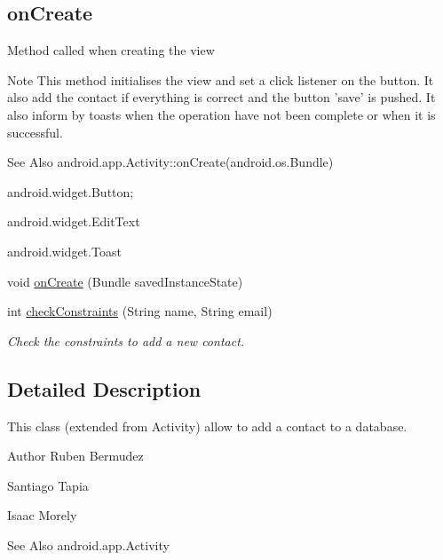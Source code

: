 \subsection*{on\-Create}
\label{_amgrp482302d6ece95c8faf5dae4403ae20ba}%
Method called when creating the view

\begin{DoxyNote}{Note}
This method initialises the view and set a click listener on the button. It also add the contact if everything is correct and the button 'save' is pushed. It also inform by toasts when the operation have not been complete or when it is successful. 
\end{DoxyNote}
\begin{DoxySeeAlso}{See Also}
android.\-app.\-Activity\-::on\-Create(android.\-os.\-Bundle) 

android.\-widget.\-Button; 

android.\-widget.\-Edit\-Text 

android.\-widget.\-Toast 
\end{DoxySeeAlso}
\begin{DoxyCompactItemize}
\item 
void \hyperlink{classnpi_1_1practicaandroid_1_1tutorialnpi_1_1_add_contact_a2d81aed04d6662a27710c309e7bd8903}{on\-Create} (Bundle saved\-Instance\-State)
\item 
int \hyperlink{classnpi_1_1practicaandroid_1_1tutorialnpi_1_1_add_contact_a1b1be0deaca8a499bed880fb55519576}{check\-Constraints} (String name, String email)
\begin{DoxyCompactList}\small\item\em Check the constraints to add a new contact. \end{DoxyCompactList}\end{DoxyCompactItemize}


\subsection{Detailed Description}
This class (extended from Activity) allow to add a contact to a database. 

\begin{DoxyAuthor}{Author}
Ruben Bermudez 

Santiago Tapia 

Isaac Morely
\end{DoxyAuthor}
\begin{DoxySeeAlso}{See Also}
android.\-app.\-Activity 
\end{DoxySeeAlso}


